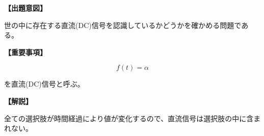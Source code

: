 \noindent \textbf{【出題意図】}

\noindent 世の中に存在する直流(DC)信号を認識しているかどうかを確かめる問題である。

\vspace{1em}
\noindent \textbf{【重要事項】}

\[
f(t) = \alpha
\]

\medskip
\noindent を直流(DC)信号と呼ぶ。


\vspace{1em}
\noindent \textbf{【解説】}

\noindent 全ての選択肢が時間経過により値が変化するので、直流信号は選択肢の中に含まれない。
